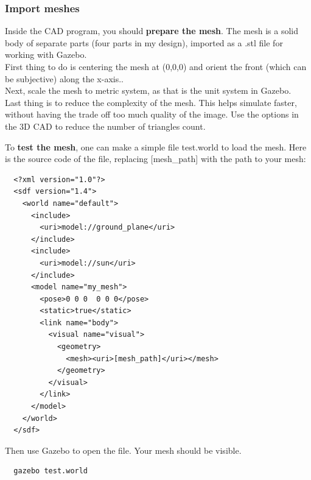 \documentclass[pdftex,12pt,a4paper]{article}
\begin{document}
  \newpage
  \subsubsection{Import meshes}
  Inside the CAD program, you should \textbf{prepare the mesh}. The mesh is a solid body of separate parts (four parts in my design), imported as a .stl file for working with Gazebo.\\
  First thing to do is centering the mesh at (0,0,0) and orient the front (which can be subjective) along the x-axis..\\
  Next, scale the mesh to metric system, as that is the unit system in Gazebo.\\
  Last thing is to reduce the complexity of the mesh. This helps simulate faster, without having the trade off too much quality of the image. Use the options in the 3D CAD to reduce the number of triangles count.\par
  To \textbf{test the mesh}, one can make a simple file test.world to load the mesh. Here is the source code of the file, replacing [mesh\_path] with the path to your mesh:
  \begin{lstlisting}
  <?xml version="1.0"?>
  <sdf version="1.4">
    <world name="default">
      <include>
        <uri>model://ground_plane</uri>
      </include>
      <include>
        <uri>model://sun</uri>
      </include>
      <model name="my_mesh">
        <pose>0 0 0  0 0 0</pose>
        <static>true</static>
        <link name="body">
          <visual name="visual">
            <geometry>
              <mesh><uri>[mesh_path]</uri></mesh>
            </geometry>
          </visual>
        </link>
      </model>
    </world>
  </sdf>
  \end{lstlisting}
  Then use Gazebo to open the file. Your mesh should be visible.
  \begin{lstlisting}
  gazebo test.world
  \end{lstlisting}
  
\end{document}
